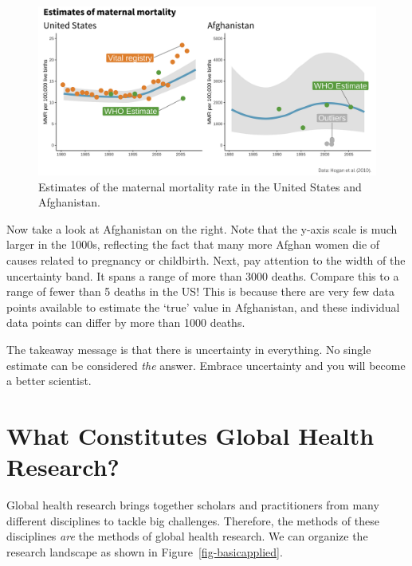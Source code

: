 \documentclass[
  letterpaper,
  DIV=11,
  numbers=noendperiod,
  oneside]{scrreprt}
\begin{document}
\begin{figure}[h]

{\centering \includegraphics{./images/figures/mmr.png}

}

\caption{\label{fig-mmr}Estimates of the maternal mortality rate in the
United States and Afghanistan.}

\end{figure}

Now take a look at Afghanistan on the right. Note that the y-axis scale
is much larger in the 1000s, reflecting the fact that many more Afghan
women die of causes related to pregnancy or childbirth. Next, pay
attention to the width of the uncertainty band. It spans a range of more
than 3000 deaths. Compare this to a range of fewer than 5 deaths in the
US! This is because there are very few data points available to estimate
the `true' value in Afghanistan, and these individual data points can
differ by more than 1000 deaths.

The takeaway message is that there is uncertainty in everything. No
single estimate can be considered \emph{the} answer. Embrace uncertainty
and you will become a better scientist.

\hypertarget{what-constitutes-global-health-research}{%
\section{What Constitutes Global Health
Research?}\label{what-constitutes-global-health-research}}

Global health research brings together scholars and practitioners from
many different disciplines to tackle big challenges. Therefore, the
methods of these disciplines \emph{are} the methods of global health
research. We can organize the research landscape as shown in
Figure~\ref{fig-basicapplied}.
\end{document}
